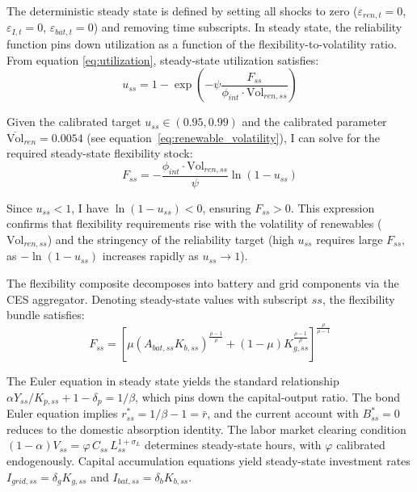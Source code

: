 \documentclass[12pt, a4paper]{article}
\begin{document}
	The deterministic steady state is defined by setting all shocks to zero ($\varepsilon_{ren,t} = 0$, $\varepsilon_{I,t} = 0$, $\varepsilon_{bat,t} = 0$) and removing time subscripts. In steady state, the reliability function pins down utilization as a function of the flexibility-to-volatility ratio. From equation \eqref{eq:utilization}, steady-state utilization satisfies:
	\begin{equation}
		u_{ss} = 1 - \exp\left(-\psi \frac{F_{ss}}{\phi_{int} \cdot \text{Vol}_{ren,ss}}\right)
		\label{eq:uss}
	\end{equation}
	
	Given the calibrated target $u_{ss} \in (0.95, 0.99)$ and the calibrated parameter $\overline{\text{Vol}}_{ren} = 0.0054$ (see equation~\ref{eq:renewable_volatility}), I can solve for the required steady-state flexibility stock:
	\begin{equation}
		F_{ss} = -\frac{\phi_{int} \cdot \text{Vol}_{ren,ss}}{\psi} \ln(1 - u_{ss})
	\end{equation}
	
	Since $u_{ss} < 1$, I have $\ln(1-u_{ss}) < 0$, ensuring $F_{ss} > 0$. This expression confirms that flexibility requirements rise with the volatility of renewables ($\text{Vol}_{ren,ss}$) and the stringency of the reliability target (high $u_{ss}$ requires large $F_{ss}$, as $-\ln(1-u_{ss})$ increases rapidly as $u_{ss} \to 1$).
	
	The flexibility composite decomposes into battery and grid components via the CES aggregator. Denoting steady-state values with subscript $ss$, the flexibility bundle satisfies:
	\begin{equation}
		F_{ss} =
		\left[
		\mu (A_{bat,ss} K_{b,ss})^{\frac{\rho-1}{\rho}}
		+
		(1-\mu) K_{g,ss}^{\frac{\rho-1}{\rho}}
		\right]^{\frac{\rho}{\rho-1}}
	\end{equation}
	
	The Euler equation in steady state yields the standard relationship $\alpha Y_{ss}/K_{p,ss} + 1 - \delta_p = 1/\beta$, which pins down the capital-output ratio. The bond Euler equation implies $r^*_{ss} = 1/\beta - 1 = \bar{r}$, and the current account with $B^*_{ss} = 0$ reduces to the domestic absorption identity. The labor market clearing condition $(1-\alpha)V_{ss} = \varphi \, C_{ss} \, L_{ss}^{1+\sigma_L}$ determines steady-state hours, with $\varphi$ calibrated endogenously. Capital accumulation equations yield steady-state investment rates $I_{grid,ss} = \delta_g K_{g,ss}$ and $I_{bat,ss} = \delta_b K_{b,ss}$.
	
\end{document}

